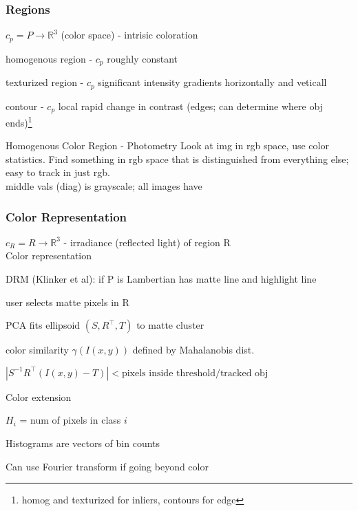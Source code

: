 \documentclass{article}
\begin{document}
\subsubsection{Regions}
$c_p = P \to \mathbb R^3$ (color space) - intrisic coloration
\begin{list}{}{}
    \item homogenous region - $c_p$ roughly constant
    \item texturized region - $c_p$ significant intensity gradients horizontally and veticall
    \item contour - $c_p$ local rapid change in contrast (edges; can determine where obj ends)\footnote[2]{homog and texturized for inliers, contours for edge}
\end{list}
\begin{expln}
    {Homogenous Color Region - Photometry}{}
    Look at img in rgb space, use color statistics. Find something in
    rgb space that is distinguished from everything else; easy to track in just rgb.
    \\
    middle vals (diag) is grayscale; all images have
\end{expln}
\subsubsection{Color Representation}
$c_R = R \to \mathbb R^3$ - irradiance (reflected light) of region R
\\
Color representation
\begin{list}{}{}
    \item DRM (Klinker et al): if P is Lambertian has matte line and highlight line
    \item user selects matte pixels in R
    \item PCA fits ellipsoid $(S,R^\top, T)$ to matte cluster
    \item color similarity $\gamma (I(x,y))$ defined by Mahalanobis dist.
    \item $|S^{-1}R^\top (I(x,y) - T)| < \text{pixels inside threshold/tracked obj}$ 
\end{list}
\noindent
Color extension 
\begin{list}{}{}
    \item $H_i$ = num of pixels in class $i$
    \item Histograms are vectors of bin counts 
    \item 
\end{list}
Can use Fourier transform if going beyond color
\end{document}
